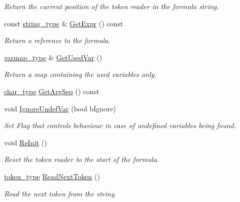 \begin{DoxyCompactItemize}
\begin{DoxyCompactList}\small\item\em Return the current position of the token reader in the formula string. \end{DoxyCompactList}\item 
const \hyperlink{namespacemu_ae9f8b44d9a97dd397180891e8390c3e9}{string\+\_\+type} \& \hyperlink{classmu_1_1_parser_token_reader_ad3bdb9f3912d8b044945a054951157fe}{Get\+Expr} () const 
\begin{DoxyCompactList}\small\item\em Return a reference to the formula. \end{DoxyCompactList}\item 
\hyperlink{namespacemu_ab57755354e948a664ad94d38546dbb10}{varmap\+\_\+type} \& \hyperlink{classmu_1_1_parser_token_reader_ae7076f6bda1d7ea11a89e9bc11b92aa4}{Get\+Used\+Var} ()
\begin{DoxyCompactList}\small\item\em Return a map containing the used variables only. \end{DoxyCompactList}\item 
\hyperlink{namespacemu_a81cc89a81a8872430ab1799b5848c5ca}{char\+\_\+type} \hyperlink{classmu_1_1_parser_token_reader_afb492575894ccf474723397b56a80129}{Get\+Arg\+Sep} () const 
\item 
void \hyperlink{classmu_1_1_parser_token_reader_a62cd2361502098231dcb9893a09e9de0}{Ignore\+Undef\+Var} (bool b\+Ignore)
\begin{DoxyCompactList}\small\item\em Set Flag that controls behaviour in case of undefined variables being found. \end{DoxyCompactList}\item 
void \hyperlink{classmu_1_1_parser_token_reader_ac991cffd605b837020a732a026b009bc}{Re\+Init} ()
\begin{DoxyCompactList}\small\item\em Reset the token reader to the start of the formula. \end{DoxyCompactList}\item 
\hyperlink{classmu_1_1_parser_token}{token\+\_\+type} \hyperlink{classmu_1_1_parser_token_reader_a36861d4d08fc658b210c1a18e80052e5}{Read\+Next\+Token} ()
\begin{DoxyCompactList}\small\item\em Read the next token from the string. \end{DoxyCompactList}\end{DoxyCompactItemize}



